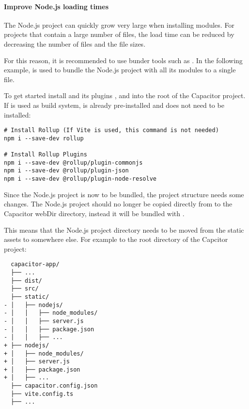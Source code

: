 \newpage

\paragraph{Improve Node.js loading times}
\label{sec:Capacitor-NodeJS:ImproveLoadingTimes}

The Node.js project can quickly grow very large when installing modules.
For projects that contain a large number of files, the load time can be reduced by decreasing the number of files and the file sizes.
\cite{nodejs-mobile:docs}

For this reason, it is recommended to use bunder tools such as .
In the following example,  is used to bundle the Node.js project with all its modules to a single file.
\cite{rollup, rollup-plugins}

To get started install  and its plugins ,  and  into the root of the Capacitor project.
If  is used as build system,  is already pre-installed and does not need to be installed:

\begin{verbatim}
# Install Rollup (If Vite is used, this command is not needed)
npm i --save-dev rollup

# Install Rollup Plugins
npm i --save-dev @rollup/plugin-commonjs
npm i --save-dev @rollup/plugin-json
npm i --save-dev @rollup/plugin-node-resolve
\end{verbatim}

Since the Node.js project is now to be bundled, the project structure needs some changes.
The Node.js project should no longer be copied directly from  to the Capacitor webDir directory, instead it will be bundled with .

This means that the Node.js project directory needs to be moved from the static assets to somewhere else.
For example to the root directory of the Capcitor project:

\begin{verbatim}
  capacitor-app/
  ├── ...
  ├── dist/
  ├── src/
  ├── static/
- │   ├── nodejs/
- │   │   ├── node_modules/
- │   │   ├── server.js
- │   │   ├── package.json
- │   │   ├── ...
+ ├── nodejs/
+ │   ├── node_modules/
+ │   ├── server.js
+ │   ├── package.json
+ │   ├── ...
  ├── capacitor.config.json
  ├── vite.config.ts
  ├── ... 
\end{verbatim}

